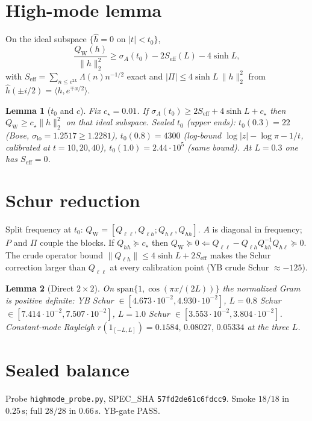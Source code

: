 \documentclass[11pt]{article}
\newtheorem{lemma}{Lemma}
\theoremstyle{remark}
\newcommand{\QW}{Q_{\mathrm W}}
\begin{document}
\section{High-mode lemma}

On the ideal subspace $\{\hat h=0\text{ on }|t|<t_0\}$,
\[
 \frac{\QW(h)}{\|h\|_2^2}
 \ge\sigma_A(t_0)-2S_{\mathrm{eff}}(L)-4\sinh L,
\]
with $S_{\mathrm{eff}}=\sum_{n\le e^{2L}}\Lambda(n)n^{-1/2}$
exact and $|\Pi|\le4\sinh L\,\|h\|_2^2$ from
$\hat h(\pm i/2)=\langle h,e^{\mp x/2}\rangle$.

\begin{lemma}[$t_0$ and $c$]\label{lem:t0}
Fix $c_\star=0.01$.  If $\sigma_A(t_0)\ge2S_{\mathrm{eff}}+4\sinh L+c_\star$
then $\QW\ge c_\star\|h\|_2^2$ on that ideal subspace.
Sealed $t_0$ (upper ends):
$t_0(0.3)=22$ (Bose, $\sigma_{\mathrm{lo}}=1.2517\ge1.2281$),
$t_0(0.8)=4300$ (log-bound $\log|z|-\log\pi-1/t$, calibrated at $t=10,20,40$),
$t_0(1.0)=2.44\cdot10^5$ (same bound).
At $L=0.3$ one has $S_{\mathrm{eff}}=0$.
\end{lemma}

\section{Schur reduction}

Split frequency at $t_0$:
$\QW=[Q_{\ell\ell},Q_{\ell h};Q_{h\ell},Q_{hh}]$.
$A$ is diagonal in frequency; $P$ and $\Pi$ couple the blocks.
If $Q_{hh}\succeq c_\star$ then
$\QW\succeq0\Longleftarrow Q_{\ell\ell}-Q_{\ell h}Q_{hh}^{-1}Q_{h\ell}\succeq0$.
The crude operator bound $\|Q_{\ell h}\|\le4\sinh L+2S_{\mathrm{eff}}$
makes the Schur correction larger than $Q_{\ell\ell}$ at every
calibration point (YB crude Schur $\approx-125$).

\begin{lemma}[Direct $2\times2$]\label{lem:22}
On $\mathrm{span}\{1,\cos(\pi x/(2L))\}$ the normalized Gram is
positive definite:
YB Schur $\in[4.673\cdot10^{-2},4.930\cdot10^{-2}]$,
$L=0.8$ Schur $\in[7.414\cdot10^{-2},7.507\cdot10^{-2}]$,
$L=1.0$ Schur $\in[3.553\cdot10^{-2},3.804\cdot10^{-2}]$.
Constant-mode Rayleigh
$r(1_{[ -L,L]})=0.1584,\,0.08027,\,0.05334$ at the three $L$.
\end{lemma}

\section{Sealed balance}

Probe \texttt{highmode\_probe.py},
SPEC\_SHA \texttt{57fd2de61c6fdcc9}.
Smoke $18/18$ in $0.25\,\mathrm{s}$; full $28/28$ in $0.66\,\mathrm{s}$.
YB-gate PASS.
\end{document}
